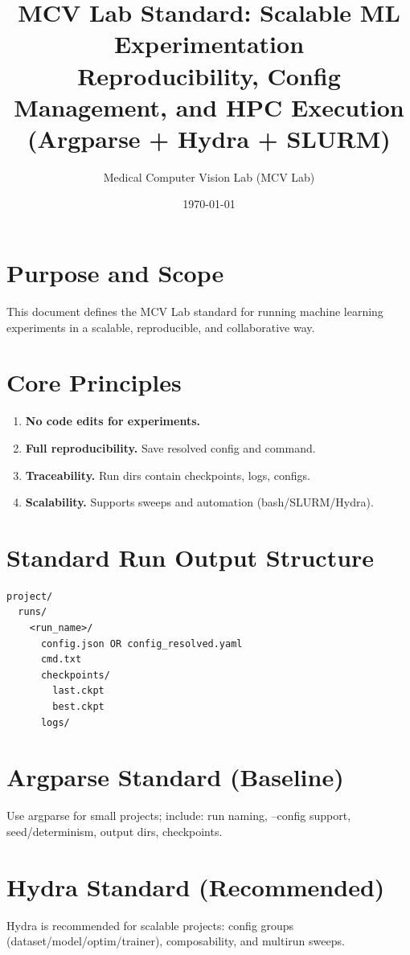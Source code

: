 \documentclass[11pt]{article}
\title{\textbf{MCV Lab Standard: Scalable ML Experimentation}\\
\large Reproducibility, Config Management, and HPC Execution (Argparse + Hydra + SLURM)}
\author{Medical Computer Vision Lab (MCV Lab)}
\date{\today}
\begin{document}
\maketitle

\section{Purpose and Scope}
This document defines the MCV Lab standard for running machine learning experiments in a scalable, reproducible, and collaborative way.

\section{Core Principles}
\begin{enumerate}[label=\textbf{P\arabic*.}, leftmargin=*]
    \item \textbf{No code edits for experiments.}
    \item \textbf{Full reproducibility.} Save resolved config and command.
    \item \textbf{Traceability.} Run dirs contain checkpoints, logs, configs.
    \item \textbf{Scalability.} Supports sweeps and automation (bash/SLURM/Hydra).
\end{enumerate}

\section{Standard Run Output Structure}
\begin{lstlisting}
project/
  runs/
    <run_name>/
      config.json OR config_resolved.yaml
      cmd.txt
      checkpoints/
        last.ckpt
        best.ckpt
      logs/
\end{lstlisting}

\section{Argparse Standard (Baseline)}
Use argparse for small projects; include: run naming, --config support, seed/determinism, output dirs, checkpoints.

\section{Hydra Standard (Recommended)}
Hydra is recommended for scalable projects: config groups (dataset/model/optim/trainer), composability, and multirun sweeps.
\end{document}
